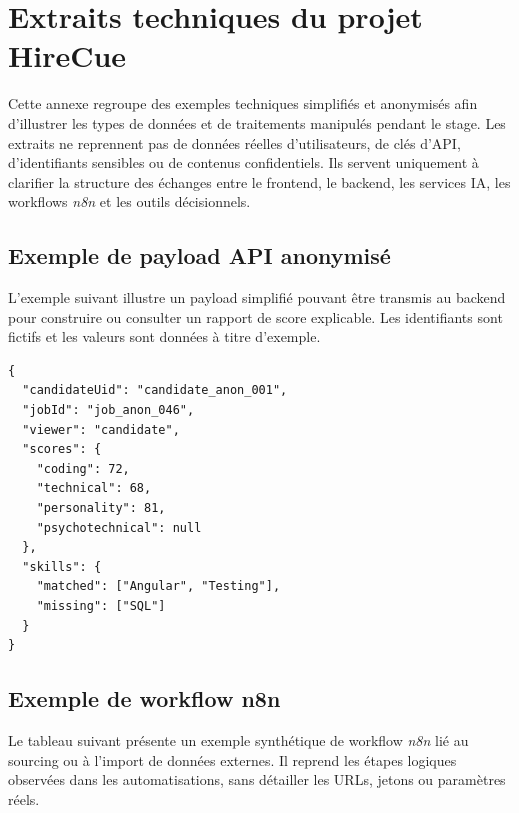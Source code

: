 \chapter{Extraits techniques du projet HireCue}

Cette annexe regroupe des exemples techniques simplifiés et anonymisés afin d'illustrer les types de données et de traitements manipulés pendant le stage. Les extraits ne reprennent pas de données réelles d'utilisateurs, de clés d'API, d'identifiants sensibles ou de contenus confidentiels. Ils servent uniquement à clarifier la structure des échanges entre le frontend, le backend, les services IA, les workflows \textit{n8n} et les outils décisionnels.

\section{Exemple de payload API anonymisé}

L'exemple suivant illustre un payload simplifié pouvant être transmis au backend pour construire ou consulter un rapport de score explicable. Les identifiants sont fictifs et les valeurs sont données à titre d'exemple.

\begin{verbatim}
{
  "candidateUid": "candidate_anon_001",
  "jobId": "job_anon_046",
  "viewer": "candidate",
  "scores": {
    "coding": 72,
    "technical": 68,
    "personality": 81,
    "psychotechnical": null
  },
  "skills": {
    "matched": ["Angular", "Testing"],
    "missing": ["SQL"]
  }
}
\end{verbatim}

\section{Exemple de workflow n8n}

Le tableau suivant présente un exemple synthétique de workflow \textit{n8n} lié au sourcing ou à l'import de données externes. Il reprend les étapes logiques observées dans les automatisations, sans détailler les URLs, jetons ou paramètres réels.

